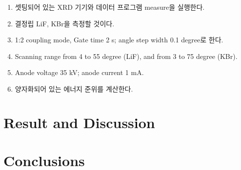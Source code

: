 \documentclass[a4paper, 10pt, nanum]{CSUniSchoolLabReport}
\begin{document}
	\begin{enumerate}[label=\arabic*.]
		\item 셋팅되어 있는 XRD 기기와 데이터 프로그램 measure을 실행한다.
		\item 결정립 LiF, KBr을 측정할 것이다.
		\item 1:2 coupling mode, Gate time 2 s; angle step width 0.1 degree로 한다.
		\item Scanning range from 4 to 55 degree (LiF), and from 3 to 75 degree (KBr).
		\item Anode voltage 35 kV; anode current 1 mA.
		\item 양자화되어 있는 에너지 준위를 계산한다.		
	\end{enumerate}


\section{Result and Discussion}




\section{Conclusions}





\end{document}

